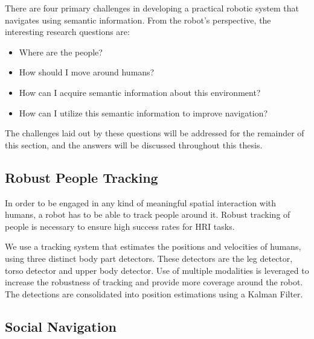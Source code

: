 There are four primary challenges in developing a practical robotic system that navigates using semantic information. From the robot's perspective, the interesting research questions are:

\begin{itemize}
\item Where are the people?
\item How should I move around humans?
\item How can I acquire semantic information about this environment?
\item How can I utilize this semantic information to improve navigation?
\end{itemize}

The challenges laid out by these questions will be addressed for the remainder of this section, and the answers will be discussed throughout this thesis.

\subsection{Robust People Tracking}

In order to be engaged in any kind of meaningful spatial interaction with humans, a robot has to be able to track people around it. Robust tracking of people is necessary to ensure high success rates for HRI tasks.

We use a tracking system that estimates the positions and velocities of humans, using three distinct body part detectors. These detectors are the leg detector, torso detector and upper body detector. Use of multiple modalities is leveraged to increase the robustness of tracking and provide more coverage around the robot. The detections are consolidated into position estimations using a Kalman Filter.

\subsection{Social Navigation}

